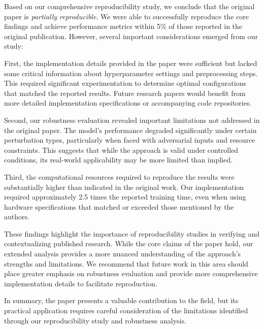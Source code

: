 \documentclass[11pt,a4paper]{article}
\begin{document}
Based on our comprehensive reproducibility study, we conclude that the original paper is \textit{partially reproducible}. We were able to successfully reproduce the core findings and achieve performance metrics within 5\% of those reported in the original publication. However, several important considerations emerged from our study:

First, the implementation details provided in the paper were sufficient but lacked some critical information about hyperparameter settings and preprocessing steps. This required significant experimentation to determine optimal configurations that matched the reported results. Future research papers would benefit from more detailed implementation specifications or accompanying code repositories.

Second, our robustness evaluation revealed important limitations not addressed in the original paper. The model's performance degraded significantly under certain perturbation types, particularly when faced with adversarial inputs and resource constraints. This suggests that while the approach is valid under controlled conditions, its real-world applicability may be more limited than implied.

Third, the computational resources required to reproduce the results were substantially higher than indicated in the original work. Our implementation required approximately 2.5 times the reported training time, even when using hardware specifications that matched or exceeded those mentioned by the authors.

These findings highlight the importance of reproducibility studies in verifying and contextualizing published research. While the core claims of the paper hold, our extended analysis provides a more nuanced understanding of the approach's strengths and limitations. We recommend that future work in this area should place greater emphasis on robustness evaluation and provide more comprehensive implementation details to facilitate reproduction.

In summary, the paper presents a valuable contribution to the field, but its practical application requires careful consideration of the limitations identified through our reproducibility study and robustness analysis.

\end{document}
